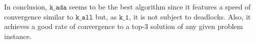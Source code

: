 In conclusion, $\texttt{k\_ada}$ seems to be the best algorithm since it features a speed of convergence similar to $\texttt{k\_all}$ but, as $\texttt{k\_1}$, it is not subject to deadlocks. Also, it achieves a good rate of convergence to a top-3 solution of any given problem instance.



\begin{comment}
main findings:
\begin{itemize}
    \item the rate of convergence to the optimal solution if not significantly impacted by the size of the problem instance (number of agents) when k is close to the number of neighbors of each agent. When k=1 we can observe a significant decrease in the performance.
    \item The number of solutions in a problem instance significantly impacts the rate of convergence to the optimal solution of all the agent types. The more the solutions, the harder is to converge to the optimal one
    \item Even though the algorithm do not converge to an optimal solution, it converges to something that is close to it (see the regret). This holds for all the agents
    \item larger value of k significantly speed up the convergence of the algorithm (less iteration are needed to find a solution). Drawback: if k is large and the problem instance is small we can have deadlocks. The adaptive agent solves this problem.
\end{itemize}
\end{comment}


